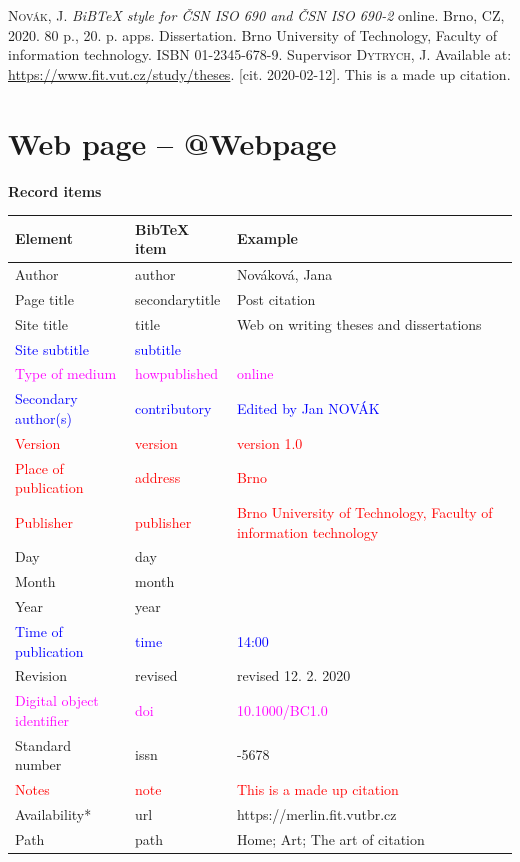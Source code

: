 \medskip

\noindent \textsc{Novák}, J. \textit{BiBTeX style for ČSN ISO 690 and ČSN ISO 690-2} online. Brno, CZ, 2020. 80 p., 20. p. apps. Dissertation. Brno University of Technology, Faculty of information technology. ISBN 01-2345-678-9. Supervisor \textsc{Dytrych}, J. Available at: \url{https://www.fit.vut.cz/study/theses}. [cit. 2020-02-12]. This is a made up citation.
\newpage
\section*{Web page -- @Webpage}
\label{pr-webpage}
\noindent \textbf{Record items}

\medskip

\begin{tabularx}{0.95\linewidth}{X X >{\raggedright\arraybackslash}X}
    Element & BibTeX item & Example\\\hline
    Author & author & Nováková, Jana\\
    Page title & secondarytitle & Post citation\\
    Site title & title & Web on writing theses and dissertations\\
    \textcolor{blue}{Site subtitle}  &  \textcolor{blue}{subtitle} & \\
    \textcolor{magenta}{Type of medium} & \textcolor{magenta}{howpublished} & \textcolor{magenta}{online}\\
    \textcolor{blue}{Secondary author(s)} & \textcolor{blue}{contributory} & \textcolor{blue}{Edited by Jan NOVÁK}\\
    \textcolor{red}{Version} & \textcolor{red}{version} & \textcolor{red}{version 1.0}\\
    \textcolor{red}{Place of publication} & \textcolor{red}{address} & \textcolor{red}{Brno}\\
    \textcolor{red}{Publisher} & \textcolor{red}{publisher} & \textcolor{red}{Brno University of Technology, Faculty of information technology}\\
    Day & day & 12\\
    Month & month & 2\\
    Year & year & 2020\\
    \textcolor{blue}{Time of publication} & \textcolor{blue}{time} & \textcolor{blue}{14:00}\\
    Revision & revised & revised 12. 2. 2020\\
    \textcolor{magenta}{Digital object identifier} & \textcolor{magenta}{doi} & \textcolor{magenta}{10.1000/BC1.0}\\
    Standard number & issn & 1234-5678\\
    \textcolor{red}{Notes} & \textcolor{red}{note} & \textcolor{red}{This is a made up citation}\\
    Availability* & url & https://merlin.fit.vutbr.cz\\
    Path & path & Home; Art; The art of citation
\end{tabularx}

